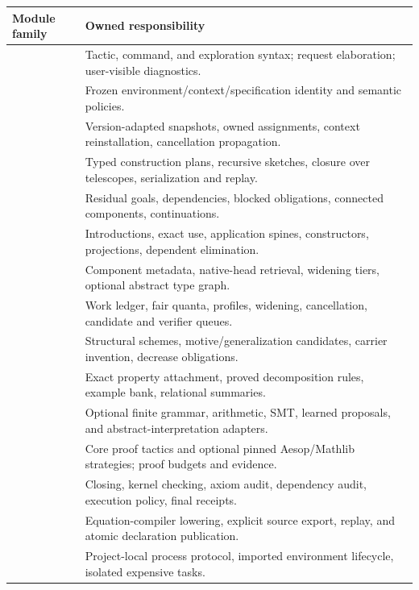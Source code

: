 \begin{longtable}{@{}L{0.31\textwidth}L{0.63\textwidth}@{}}
\toprule
Module family & Owned responsibility \\
\midrule\endhead
{} & Tactic, command, and exploration syntax; request elaboration; user-visible diagnostics. \\
 & Frozen environment/context/specification identity and semantic policies. \\
 & Version-adapted snapshots, owned assignments, context reinstallation, cancellation propagation. \\
 & Typed construction plans, recursive sketches, closure over telescopes, serialization and replay. \\
 & Residual goals, dependencies, blocked obligations, connected components, continuations. \\
 & Introductions, exact use, application spines, constructors, projections, dependent elimination. \\
 & Component metadata, native-head retrieval, widening tiers, optional abstract type graph. \\
 & Work ledger, fair quanta, profiles, widening, cancellation, candidate and verifier queues. \\
 & Structural schemes, motive/generalization candidates, carrier invention, decrease obligations. \\
 & Exact property attachment, proved decomposition rules, example bank, relational summaries. \\
 & Optional finite grammar, arithmetic, SMT, learned proposals, and abstract-interpretation adapters. \\
 & Core proof tactics and optional pinned Aesop/Mathlib strategies; proof budgets and evidence. \\
 & Closing, kernel checking, axiom audit, dependency audit, execution policy, final receipts. \\
 & Equation-compiler lowering, explicit source export, replay, and atomic declaration publication. \\
 & Project-local process protocol, imported environment lifecycle, isolated expensive tasks. \\
\bottomrule
\end{longtable}

